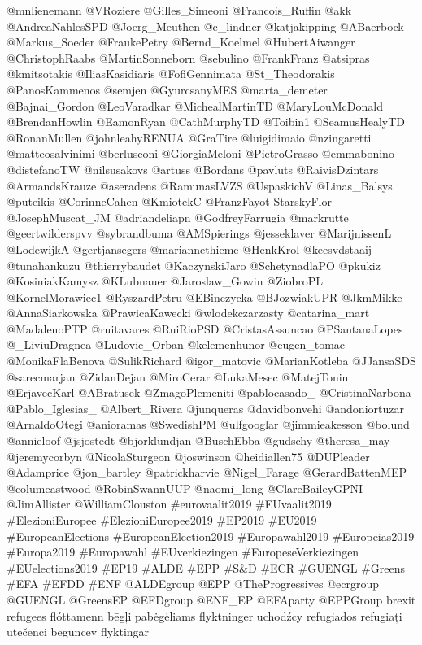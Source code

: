 \begin{multicols}{3}
{@mnlienemann
@VRoziere
@Gilles\_Simeoni
@Francois\_Ruffin
@akk
@AndreaNahlesSPD
@Joerg\_Meuthen
@c\_lindner
@katjakipping
@ABaerbock
@Markus\_Soeder
@FraukePetry
@Bernd\_Koelmel
@HubertAiwanger
@ChristophRaabs
@MartinSonneborn
@sebulino
@FrankFranz
@atsipras
@kmitsotakis
@IliasKasidiaris
@FofiGennimata
@St\_Theodorakis
@PanosKammenos
@semjen
@GyurcsanyMES
@marta\_demeter
@Bajnai\_Gordon
@LeoVaradkar
@MichealMartinTD
@MaryLouMcDonald
@BrendanHowlin
@EamonRyan
@CathMurphyTD
@Toibin1
@SeamusHealyTD
@RonanMullen
@johnleahyRENUA
@GraTire
@luigidimaio
@nzingaretti
@matteosalvinimi
@berlusconi
@GiorgiaMeloni
@PietroGrasso
@emmabonino
@distefanoTW
@nilsusakovs
@artuss
@Bordans
@pavluts
@RaivisDzintars
@ArmandsKrauze
@aseradens
@RamunasLVZS
@UspaskichV
@Linas\_Balsys
@puteikis
@CorinneCahen
@KmiotekC
@FranzFayot
StarskyFlor
@JosephMuscat\_JM
@adriandeliapn
@GodfreyFarrugia
@markrutte
@geertwilderspvv
@sybrandbuma
@AMSpierings
@jesseklaver
@MarijnissenL
@LodewijkA
@gertjansegers
@mariannethieme
@HenkKrol
@keesvdstaaij
@tunahankuzu
@thierrybaudet
@KaczynskiJaro
@SchetynadlaPO
@pkukiz
@KosiniakKamysz
@KLubnauer
@Jaroslaw\_Gowin
@ZiobroPL
@KornelMorawiec1
@RyszardPetru
@EBinczycka
@BJozwiakUPR
@JkmMikke
@AnnaSiarkowska
@PrawicaKawecki
@wlodekczarzasty
@catarina\_mart
@MadalenoPTP
@ruitavares
@RuiRioPSD
@CristasAssuncao
@PSantanaLopes
@\_LiviuDragnea
@Ludovic\_Orban
@kelemenhunor
@eugen\_tomac
@MonikaFlaBenova
@SulikRichard
@igor\_matovic
@MarianKotleba
@JJansaSDS
@sarecmarjan
@ZidanDejan
@MiroCerar
@LukaMesec
@MatejTonin
@ErjavecKarl
@ABratusek
@ZmagoPlemeniti
@pablocasado\_
@CristinaNarbona
@Pablo\_Iglesias\_
@Albert\_Rivera
@junqueras
@davidbonvehi
@andoniortuzar
@ArnaldoOtegi
@anioramas
@SwedishPM
@ulfgooglar
@jimmieakesson
@bolund
@annieloof
@jsjostedt
@bjorklundjan
@BuschEbba
@gudschy
@theresa\_may
@jeremycorbyn
@NicolaSturgeon
@joswinson
@heidiallen75
@DUPleader
@Adamprice
@jon\_bartley
@patrickharvie
@Nigel\_Farage
@GerardBattenMEP
@columeastwood
@RobinSwannUUP
@naomi\_long
@ClareBaileyGPNI
@JimAllister
@WilliamClouston
\#eurovaalit2019
\#EUvaalit2019
\#ElezioniEuropee
\#ElezioniEuropee2019
\#EP2019
\#EU2019
\#EuropeanElections
\#EuropeanElection2019
\#Europawahl2019
\#Europeias2019
\#Europa2019
\#Europawahl
\#EUverkiezingen
\#EuropeseVerkiezingen
\#EUelections2019
\#EP19
\#ALDE
\#EPP
\#S\&D
\#ECR
\#GUENGL
\#Greens
\#EFA
\#EFDD
\#ENF
@ALDEgroup
@EPP
@TheProgressives
@ecrgroup
@GUENGL
@GreensEP
@EFDgroup
@ENF\_EP
@EFAparty
@EPPGroup
brexit
refugees
flóttamenn
bēgļi
pabėgėliams
flyktninger
uchodźcy
refugiados
refugiați
utečenci
beguncev
flyktingar
}
\end{multicols}
